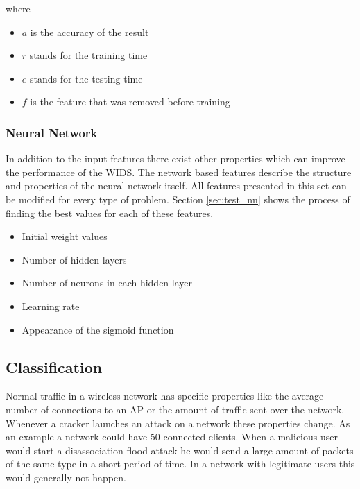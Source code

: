 where

\begin{itemize}
	\addtolength{\itemsep}{-1.5ex}

    \item $a$ is the accuracy of the result
	\item $r$ stands for the training time
	\item $e$ stands for the testing time
	\item $f$ is the feature that was removed before training

\end{itemize}

\subsubsection{Neural Network}

In addition to the input features there exist other properties which can improve the performance of the WIDS. The network based features describe the structure and properties of the neural network itself. All features presented in this set can be modified for every type of problem. Section \ref{sec:test_nn} shows the process of finding the best values for each of these features.

\begin{itemize}
	\addtolength{\itemsep}{-1.5ex}
    \item Initial weight values
    \item Number of hidden layers
    \item Number of neurons in each hidden layer
    \item Learning rate
    \item Appearance of the sigmoid function
\end{itemize}

\subsection{Classification}

Normal traffic in a wireless network has specific properties like the average number of connections to an AP or the amount of traffic sent over the network. Whenever a cracker launches an attack on a network these properties change. As an example a network could have 50 connected clients. When a malicious user would start a disassociation flood attack he would send a large amount of packets of the same type in a short period of time. In a network with legitimate users this would generally not happen.

